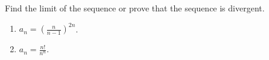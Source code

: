 Find the limit of the sequence or prove that the sequence is divergent.
\begin{enumerate}
\item $\displaystyle a_n=\left(\frac{n}{n-1}\right)^{2n}$.
\item $\displaystyle a_n=\frac{n!}{n^n}$.
\end{enumerate}
